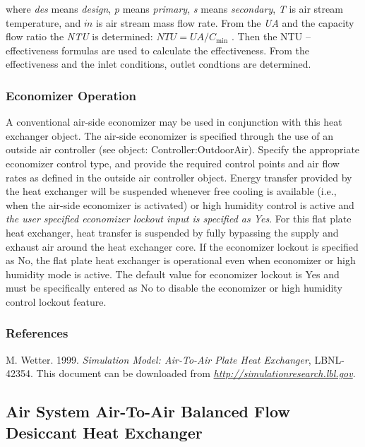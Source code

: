where \emph{des} means \emph{design}, \emph{p} means \emph{primary}, \emph{s} means \emph{secondary}, \emph{T} is air stream temperature, and \(\dot m\) is air stream mass flow rate. From the \emph{UA} and the capacity flow ratio the \emph{NTU} is determined: \(NTU = UA/{C_{\min }}\) . Then the NTU -- effectiveness formulas are used to calculate the effectiveness. From the effectiveness and the inlet conditions, outlet condtions are determined.

\subsubsection{Economizer Operation}\label{economizer-operation-1}

A conventional air-side economizer may be used in conjunction with this heat exchanger object. The air-side economizer is specified through the use of an outside air controller (see object: Controller:OutdoorAir). Specify the appropriate economizer control type, and provide the required control points and air flow rates as defined in the outside air controller object. Energy transfer provided by the heat exchanger will be suspended whenever free cooling is available (i.e., when the air-side economizer is activated) or high humidity control is active and \emph{the user specified economizer lockout input is specified as Yes}. For this flat plate heat exchanger, heat transfer is suspended by fully bypassing the supply and exhaust air around the heat exchanger core. If the economizer lockout is specified as No, the flat plate heat exchanger is operational even when economizer or high humidity mode is active. The default value for economizer lockout is Yes and must be specifically entered as No to disable the economizer or high humidity control lockout feature.

\subsubsection{References}\label{references-1-010}

M. Wetter. 1999. \emph{Simulation Model: Air-To-Air Plate Heat Exchanger}, LBNL-42354. This document can be downloaded from \href{http://simulationresearch.lbl.gov}{\emph{http://simulationresearch.lbl.gov}}.

\subsection{Air System Air-To-Air Balanced Flow Desiccant Heat Exchanger}\label{air-system-air-to-air-balanced-flow-desiccant-heat-exchanger}

